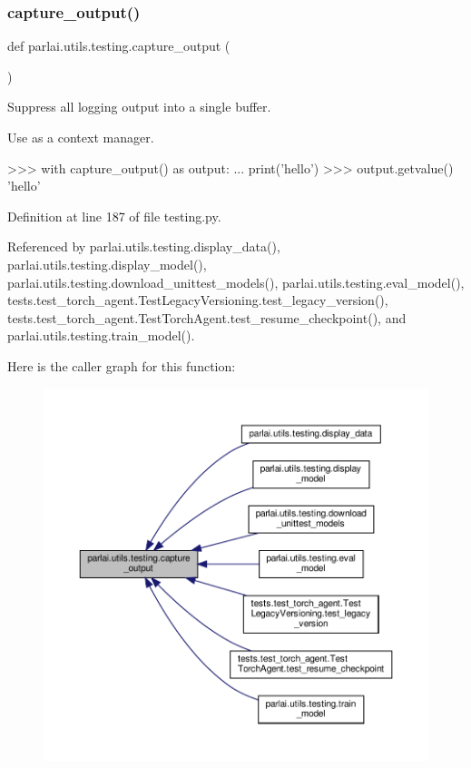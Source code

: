 \subsubsection{\texorpdfstring{capture\+\_\+output()}{capture\_output()}}
{\footnotesize\ttfamily def parlai.\+utils.\+testing.\+capture\+\_\+output (\begin{DoxyParamCaption}{ }\end{DoxyParamCaption})}

\begin{DoxyVerb}Suppress all logging output into a single buffer.

Use as a context manager.

>>> with capture_output() as output:
...     print('hello')
>>> output.getvalue()
'hello'
\end{DoxyVerb}
 

Definition at line 187 of file testing.\+py.



Referenced by parlai.\+utils.\+testing.\+display\+\_\+data(), parlai.\+utils.\+testing.\+display\+\_\+model(), parlai.\+utils.\+testing.\+download\+\_\+unittest\+\_\+models(), parlai.\+utils.\+testing.\+eval\+\_\+model(), tests.\+test\+\_\+torch\+\_\+agent.\+Test\+Legacy\+Versioning.\+test\+\_\+legacy\+\_\+version(), tests.\+test\+\_\+torch\+\_\+agent.\+Test\+Torch\+Agent.\+test\+\_\+resume\+\_\+checkpoint(), and parlai.\+utils.\+testing.\+train\+\_\+model().

Here is the caller graph for this function\+:
\nopagebreak
\begin{figure}[H]
\begin{center}
\leavevmode
\includegraphics[width=350pt]{namespaceparlai_1_1utils_1_1testing_ab00d4d693202afab92c06387aa50699b_icgraph}
\end{center}
\end{figure}
\mbox{\label{namespaceparlai_1_1utils_1_1testing_a30c532f112f9beddd873382e649b3ecd}} 
